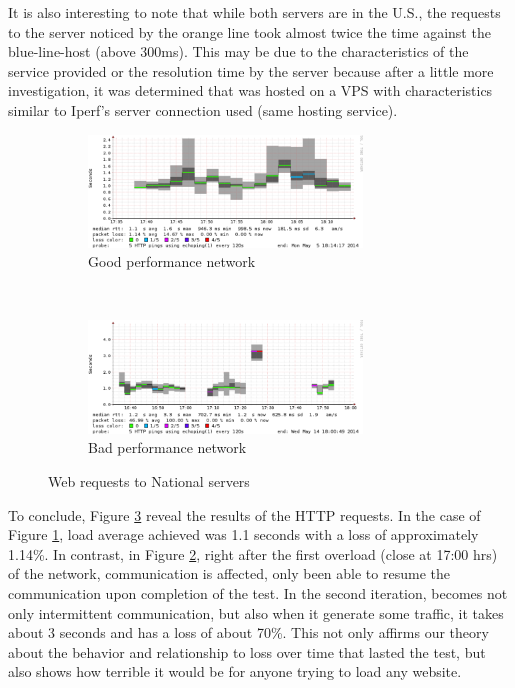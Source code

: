 It is also interesting to note that while both servers are in the U.S., the
requests to the server noticed by the orange line took almost twice the time
against the blue-line-host  (above 300ms). This may be due to the
characteristics of the service provided or the resolution time by the server
because after a little more investigation, it was determined that was hosted
on a VPS with characteristics similar to Iperf's server connection used (same
hosting service).

\begin{figure}
\begin{subfigure}{\textwidth}
\centering
    \includegraphics[width=0.8\textwidth]{img/smoke_inf_good}
\caption[Smokeping: Web requests with good performance]{Good performance network}
\label{fig:smokewebgood}
\end{subfigure}%
\\
\begin{subfigure}{\textwidth}
\centering
    \includegraphics[width=0.8\textwidth]{img/smoke_inf_bad}
\caption[Smokeping: Web requests with bad performance]{Bad performance network}
\label{fig:smokewebbad}
\end{subfigure}
\caption[Smokeping: Web requests to National servers]{Web requests to National servers}
\label{fig:smokeweb}
\end{figure}

To conclude, Figure \ref{fig:smokeweb}  reveal the results of the HTTP
requests. In the case of Figure \ref{fig:smokewebgood}, load average achieved
was 1.1 seconds  with a loss of approximately 1.14\%. In contrast, in Figure
\ref{fig:smokewebbad}, right after the first overload (close at 17:00 hrs) of
the network, communication is affected, only been able to resume the
communication upon completion of the test. In the second iteration, becomes
not only intermittent communication, but also when it generate some traffic,
it takes about 3 seconds and has a loss of about 70\%. This not only affirms
our theory about the behavior and relationship to loss over time that lasted
the test, but also shows how terrible it would be for anyone trying to load
any website.
